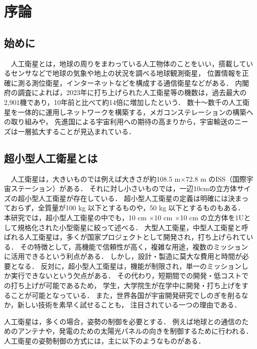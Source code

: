 \section{序論}
\subsection{始めに}
　人工衛星とは，地球の周りをまわっている人工物体のことをいい，搭載しているセンサなどで地球の気象や地上の状況を調べる地球観測衛星，
位置情報を正確に測る測位衛星，インターネットなどを構成する通信衛星などがある．
内閣府の調査によれば，2023年に打ち上げられた人工衛星等の機数は，過去最大の2,901機であり，10年前と比べて約14倍に増加したという．
数十～数千の人工衛星を一体的に運用しネットワークを構築する，メガコンステレーションの構築への取り組みや，
先進国による宇宙利用への期待の高まりから，宇宙輸送のニーズは一層拡大することが見込まれている．


\subsection{超小型人工衛星とは}
　人工衛星は，大きいものでは例えば大きさが約108.5 m×72.8 m のISS（国際宇宙ステーション）がある．
それに対し小さいものでは，一辺10cmの立方体サイズの超小型人工衛星が存在している．
超小型人工衛星の定義は明確には決まっておらず，全質量が100 kg 以下とするものや，50 kg 以下とするものもある．
本研究では，超小型人工衛星の中でも，10 cm ×10 cm ×10 cm の立方体を1Uとして規格化された小型衛星に絞って述べる．
大型人工衛星，中型人工衛星と呼ばれる人工衛星は，多くが国家プロジェクトとして開発され，打ち上げられている．
その特徴として，高機能で信頼性が高く，複雑な用途，複数のミッションに活用できるという利点がある．
しかし，設計・製造に莫大な費用と時間が必要となる．
反対に，超小型人工衛星は，機能が制限され，単一のミッションしか実行できないという欠点がある．
その代わり，短期間での開発・低コストでの打ち上げが可能であるため，
学生，大学院生が在学中に開発・打ち上げをすることが可能となっている．
また，世界各国が宇宙開発研究でしのぎを削るなか，新しい技術を素早く試せることも，
注目されている一つの理由である．


人工衛星は，多くの場合，姿勢の制御を必要とする．
例えば地球との通信のためのアンテナや，発電のための太陽光パネルの向きを制御するために行われる．
人工衛星の姿勢制御の方式には，主に以下のようなものがある．

